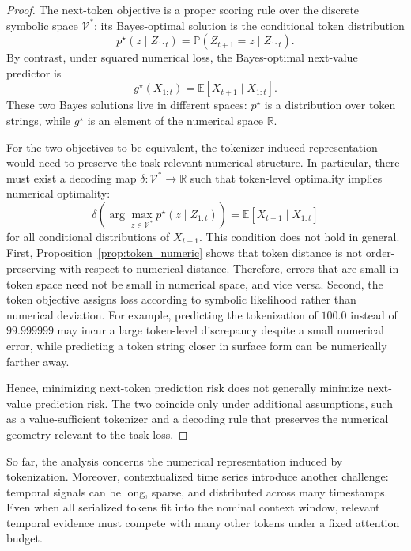 \begin{proof}
The next-token objective is a proper scoring rule over the discrete symbolic
space $\mathcal{V}^*$; its Bayes-optimal solution is the conditional token
distribution
\begin{equation}
    p^\star(z\mid Z_{1:t})
    =
    \mathbb{P}(Z_{t+1}=z\mid Z_{1:t}).
\end{equation}
By contrast, under squared numerical loss, the Bayes-optimal next-value predictor is
\begin{equation}
    g^\star(X_{1:t})
    =
    \mathbb{E}[X_{t+1}\mid X_{1:t}].
\end{equation}
These two Bayes solutions live in different spaces: $p^\star$ is a distribution
over token strings, while $g^\star$ is an element of the numerical space
$\mathbb{R}$.

For the two objectives to be equivalent, the tokenizer-induced representation
would need to preserve the task-relevant numerical structure. In particular,
there must exist a decoding map $\delta:\mathcal{V}^*\rightarrow\mathbb{R}$ such
that token-level optimality implies numerical optimality:
\begin{equation}
    \delta\left(
    \arg\max_{z\in\mathcal{V}^*}
    p^\star(z\mid Z_{1:t})
    \right)
    =
    \mathbb{E}[X_{t+1}\mid X_{1:t}]
\end{equation}
for all conditional distributions of $X_{t+1}$. This condition does not hold in
general. First, Proposition~\ref{prop:token_numeric} shows that token distance is
not order-preserving with respect to numerical distance. Therefore, errors that
are small in token space need not be small in numerical space, and vice versa.
Second, the token objective assigns loss according to symbolic likelihood rather
than numerical deviation. For example, predicting the tokenization of $100.0$
instead of $99.999999$ may incur a large token-level discrepancy despite a small
numerical error, while predicting a token string closer in surface form can be
numerically farther away.

Hence, minimizing next-token prediction risk does not generally minimize
next-value prediction risk. The two coincide only under additional assumptions,
such as a value-sufficient tokenizer and a decoding rule that preserves the
numerical geometry relevant to the task loss.
\end{proof}



So far, the analysis concerns the numerical representation induced by
tokenization. Moreover, contextualized time series introduce another challenge: temporal
signals can be long, sparse, and distributed across many timestamps. Even when
all serialized tokens fit into the nominal context window, relevant temporal
evidence must compete with many other tokens under a fixed attention budget.




